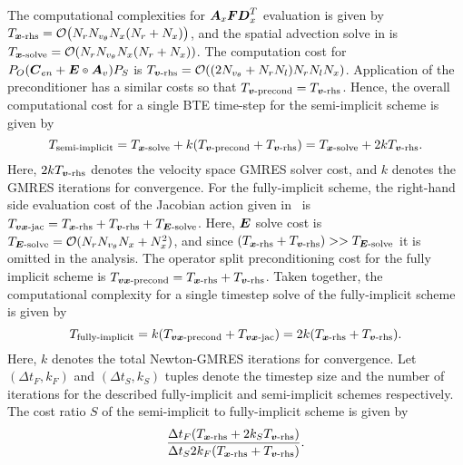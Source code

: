 The computational complexities for $\boldsymbol{A}_x \boldsymbol{F} \boldsymbol{D}_x^T$ evaluation is given by $T_{\vect{x}\text{-rhs}} = \mathcal{O}\big(N_r N_{\vtheta} N_x \of{N_r + N_x}\big)$,  and the spatial advection solve in  is $T_{\vect{x}\text{-solve}} = \mathcal{O}\of{N_r N_{\vtheta} N_x \of{N_r + N_x}}$. The computation cost for $P_O\of{\vect C_{en} + \vect E\pdot \vect A_v} P_S$ is $T_{\vect{v}\text{-rhs}} = \mathcal{O} \of{\of{2 N_\vtheta + N_r N_l} N_r N_l N_x}$. Application of the preconditioner has a similar costs so that $T_{\boldsymbol{v}\text{-precond}} = T_{\boldsymbol{v}\text{-rhs}}$. Hence, the overall computational cost for a single BTE time-step for the semi-implicit scheme is given by 
\begin{equation}
	T_{\text{semi-implicit}} =  T_{\boldsymbol{x}\text{-solve}} + k(T_{\boldsymbol{v}\text{-precond}} + T_{\boldsymbol{v}\text{-rhs}}) = T_{\boldsymbol{x}\text{-solve}} + 2kT_{\boldsymbol{v}\text{-rhs}} \label{eq:semi_imp_ts_cost}.
\end{equation} 
Here, $2kT_{\boldsymbol{v}\text{-rhs}}$ denotes the velocity space GMRES solver cost, and $k$ denotes the GMRES iterations for convergence. 
For the fully-implicit scheme, the right-hand side evaluation cost of the Jacobian action given in~ is $T_{\boldsymbol{vx}\text{-jac}} = T_{\boldsymbol{x}\text{-rhs}} + T_{\boldsymbol{v}\text{-rhs}} + T_{\boldsymbol{E}\text{-solve}}$. Here, $\boldsymbol{E}$ solve cost is $T_{\boldsymbol{E}\text{-solve}} = \mathcal{O}(N_r N_{v_{\theta}} N_x + N_x^2)$, and since $(T_{\boldsymbol{x}\text{-rhs}} + T_{\boldsymbol{v}\text{-rhs}}) >> T_{\boldsymbol{E}\text{-solve}}$ it is omitted in the analysis. The operator split preconditioning cost for the fully implicit scheme is $T_{\boldsymbol{vx}\text{-precond}} = T_{\boldsymbol{x}\text{-rhs}} + T_{\boldsymbol{v}\text{-rhs}}$. Taken together, the computational complexity for a single timestep solve of the fully-implicit scheme is given by
\begin{equation}
T_{\text{fully-implicit}} = k(T_{\boldsymbol{vx}\text{-precond}} + T_{\boldsymbol{vx}\text{-jac}}) = 2k(T_{\boldsymbol{x}\text{-rhs}} + T_{\boldsymbol{v}\text{-rhs}}) \label{eq:bte_imp_complexity}.
\end{equation} Here, $k$ denotes the total Newton-GMRES iterations for convergence.
Let $(\Delta t_F,k_F)$ and $(\Delta t_S,k_S)$ tuples denote the timestep size and the number of iterations for the described fully-implicit and semi-implicit schemes respectively. The cost ratio $S$ of the semi-implicit to fully-implicit scheme is given by
\begin{equation}
	\frac{\Delta t_F \of{T_{\vect{x}\text{-rhs}} + 2k_S T_{\vect{v}\text{-rhs}}}}{\Delta t_S 2k_F \of{T_{\vect{x}\text{-rhs}} + T_{\vect{v}\text{-rhs}}}} \label{eq:ts_efficiency}.
\end{equation} 
